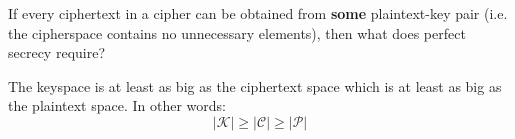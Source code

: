 \documentclass{article}
\newcounter{qcounter}
\newcommand{\showqcounter}{\theqcounter}
\newcommand{\question}{\vspace{5mm}\addtocounter{qcounter}{1}\vspace{5mm}{\bf Q\showqcounter: }}
\newcommand{\answer}{\vspace{5mm}{\bf A\showqcounter: }}
\begin{document}
\question If every ciphertext in a cipher can be obtained from {\bf some} plaintext-key pair (i.e. the cipherspace contains no unnecessary 
  elements), then what does perfect secrecy require?

\answer The keyspace is at least as big as the ciphertext space which is at least as big as the plaintext space. In other words:
  $$
    \vert \mathcal{K} \vert \geq \vert \mathcal{C} \vert \geq \vert \mathcal{P} \vert
  $$


\question

\answer


\question

\answer


\question

\answer


\question

\answer
\end{document}
